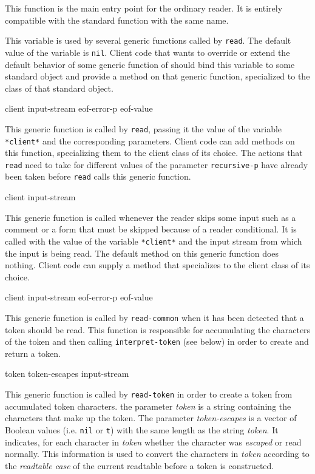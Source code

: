 This function is the main entry point for the ordinary reader.  It is
entirely compatible with the standard \commonlisp{} function with the
same name.


This variable is used by several generic functions called by
\texttt{read}.  The default value of the variable is \texttt{nil}.
Client code that wants to override or extend the default behavior of
some generic function of \sysname{} should bind this variable to some
standard object and provide a method on that generic function,
specialized to the class of that standard object.

 {client input-stream eof-error-p eof-value}

This generic function is called by \texttt{read}, passing it the value
of the variable \texttt{*client*} and the corresponding parameters.
Client code can add methods on this function, specializing them to the
client class of its choice.  The actions that \texttt{read} need to
take for different values of the parameter \texttt{recursive-p} have
already been taken before \texttt{read} calls this generic function.

 {client input-stream}

This generic function is called whenever the reader skips some input
such as a comment or a form that must be skipped because of a reader
conditional.  It is called with the value of the variable
\texttt{*client*} and the input stream from which the input is being
read.  The default method on this generic function does nothing.
Client code can supply a method that specializes to the client class
of its choice.

 {client input-stream eof-error-p eof-value}

This generic function is called by \texttt{read-common} when it has
been detected that a token should be read.  This function is
responsible for accumulating the characters of the token and then
calling \texttt{interpret-token} (see below) in order to create and
return a token.

 {token token-escapes input-stream}

This generic function is called by \texttt{read-token} in order to
create a token from accumulated token characters.  the parameter
\textit{token} is a string containing the characters that make up the
token.  The parameter \textit{token-escapes} is a vector of Boolean
values (i.e. \texttt{nil} or \texttt{t}) with the same length as the
string \textit{token}.  It indicates, for each character in
\textit{token} whether the character was \emph{escaped} or read
normally.  This information is used to convert the characters in
\textit{token} according to the \emph{readtable case} of the current
readtable before a token is constructed.

